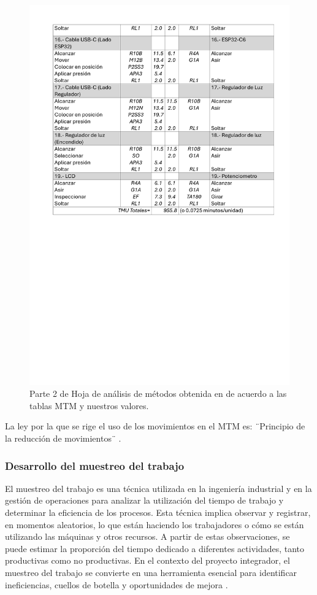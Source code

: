 \begin{figure}[H]
    \centering
    \includegraphics[scale=0.25]{15/img/tablaMTM1-3.pdf}
    \caption{ Parte 2 de Hoja de análisis de métodos obtenida en de acuerdo a las tablas MTM y nuestros valores.}
    \label{fig:tablaMTM1-2}
\end{figure}

La ley por la que se rige el uso de los movimientos en el MTM es: ¨Principio de la reducción de movimientos¨ \cite{estudio_del_trabajo_ii}.
% 
\subsubsection{Desarrollo del muestreo del trabajo}
% 
El muestreo del trabajo es una técnica utilizada en la ingeniería industrial y en la gestión de operaciones para analizar la utilización del tiempo de trabajo y determinar la eficiencia de los procesos. Esta técnica implica observar y registrar, en momentos aleatorios, lo que están haciendo los trabajadores o cómo se están utilizando las máquinas y otros recursos. A partir de estas observaciones, se puede estimar la proporción del tiempo dedicado a diferentes actividades, tanto productivas como no productivas. En el contexto del proyecto integrador, el muestreo del trabajo se convierte en una herramienta esencial para identificar ineficiencias, cuellos de botella y oportunidades de mejora \cite{muestreo-trabajo}.
% 
